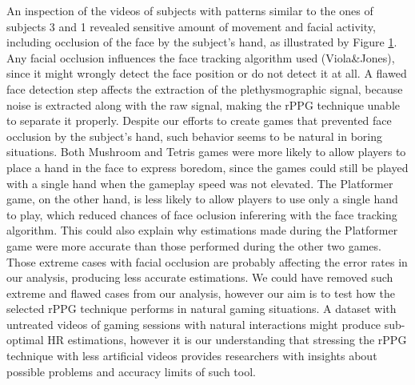 An inspection of the videos of subjects with patterns similar to the ones of subjects 3 and 1 revealed sensitive amount of movement and facial activity, including occlusion of the face by the subject's hand, as illustrated by Figure \ref{fig:face-variation}. Any facial occlusion influences the face tracking algorithm used (Viola\&Jones), since it might wrongly detect the face position or do not detect it at all. A flawed face detection step affects the extraction of the plethysmographic signal, because noise is extracted along with the raw signal, making the rPPG technique unable to separate it properly. Despite our efforts to create games that prevented face occlusion by the subject's hand, such behavior seems to be natural in boring situations. Both Mushroom and Tetris games were more likely to allow players to place a hand in the face to express boredom, since the games could still be played with a single hand when the gameplay speed was not elevated. The Platformer game, on the other hand, is less likely to allow players to use only a single hand to play, which reduced chances of face oclusion inferering with the face tracking algorithm. This could also explain why estimations made during the Platformer game were more accurate than those performed during the other two games. Those extreme cases with facial occlusion are probably affecting the error rates in our analysis, producing less accurate estimations. We could have removed such extreme and flawed cases from our analysis, however our aim is to test how the selected rPPG technique performs in natural gaming situations. A dataset with untreated videos of gaming sessions with natural interactions might produce sub-optimal HR estimations, however it is our understanding that stressing the rPPG technique with less artificial videos provides researchers with insights about possible problems and accuracy limits of such tool.

\begin{figure}[!t]
\label{fig:face-variation}
\end{figure}


